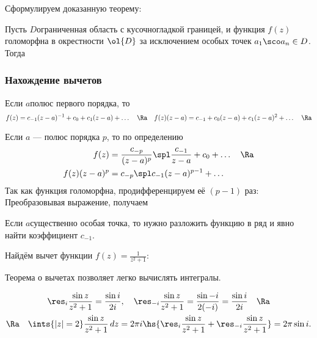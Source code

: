 \documentclass[a4paper]{article}
\begin{document}
Сформулируем доказанную теорему:

\begin{theorem}[о вычетах]
Пусть $D$\т ограниченная область с кусочно\д гладкой границей, и функция $f(z)$
голоморфна в окрестности $\ol{D}$ за исключением особых точек $a_1 \sco a_n \in D$. Тогда
\end{theorem}

\subsubsection{Нахождение вычетов}

 Если $a$\т полюс первого порядка, то
$$f(z)=c_{-1}(z-a)^{-1}+c_0+c_1(z-a)+\ldots \quad \Ra \quad f(z)(z-a)=c_{-1}+c_0(z-a)+c_1(z-a)^2 +\ldots \quad \Ra$$

 Если $a$ --- полюс порядка $p$, то по определению
\begin{align*}
f(z) &= \frac{c_{-p}}{(z-a)^p} \spl \frac{c_{-1}}{z-a}+c_0 + \ldots \quad \Ra\\
f(z)(z-a)^p &= c_{-p} \spl c_{-1}(z-a)^{p-1}+\ldots
\end{align*}
Так как функция голоморфна, продифференцируем её $(p-1)$ раз:
Преобразовывая выражение, получаем

 Если $a$\т существенно особая точка, то нужно разложить функцию в ряд и явно найти коэффициент $c_{-1}$.

\begin{ex}
Найдём вычет функции $f(z) = \frac{1}{z^2+1}$:
\end{ex}

\begin{ex}
\end{ex}

Теорема о вычетах позволяет легко вычислять интегралы.

\begin{ex}
\begin{multline*}
\res_i\frac{\sin z}{z^2+1}=\frac{\sin i}{2i}, \quad \res_{-i}\frac{\sin z}{z^2+1}=\frac{\sin -i}{2 (-i)}= \frac{\sin i}{2 i} \quad \Ra\\
\Ra \quad \ints{|z|=2}\frac{\sin z}{z^2+1}\,dz = 2\pi i\hs{\res_i\frac{\sin z}{z^2+1}+\res_{-i}\frac{\sin z}{z^2+1}}=2\pi\sin i.
\end{multline*}
\end{ex}
\end{document}

